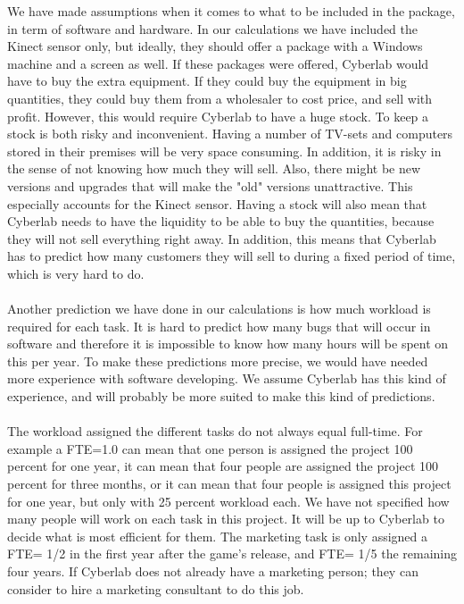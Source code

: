 We have made assumptions when it comes to what to be included in the package, in term of software and hardware. In our calculations we have included the Kinect sensor only, but ideally, they should offer a package with a Windows machine and a screen as well. If these packages were offered, Cyberlab would have to buy the extra equipment. If they could buy the equipment in big quantities, they could buy them from a wholesaler to cost price, and sell with profit. However, this would require Cyberlab to have a huge stock. To keep a stock is both risky and inconvenient. Having a number of TV-sets and computers stored in their premises will be very space consuming. In addition, it is risky in the sense of not knowing how much they will sell. Also, there might be new versions and upgrades that will make the "old" versions unattractive. This especially accounts for the Kinect sensor. Having a stock will also mean that Cyberlab needs to have the liquidity to be able to buy the quantities, because they will not sell everything right away. In addition, this means that Cyberlab has to predict how many customers they will sell to during a fixed period of time, which is very hard to do. \\ \\
Another prediction we have done in our calculations is how much workload is required for each task. It is hard to predict how many bugs that will occur in software and therefore it is impossible to know how many hours will be spent on this per year. To make these predictions more precise, we would have needed more experience with software developing. We assume Cyberlab has this kind of experience, and will probably be more suited to make this kind of predictions.\\ \\
The workload assigned the different tasks do not always equal full-time. For example a FTE=1.0 can mean that one person is assigned the project 100 percent for one year, it can mean that four people are assigned the project 100 percent for three months, or it can mean that four people is assigned this project for one year, but only with 25 percent workload each. We have not specified how many people will work on each task in this project. It will be up to Cyberlab to decide what is most efficient for them. The marketing task is only assigned a FTE= 1/2 in the first year after the game’s release, and FTE= 1/5 the remaining four years. If Cyberlab does not already have a marketing person; they can consider to hire a marketing consultant to do this job. \\ \\
